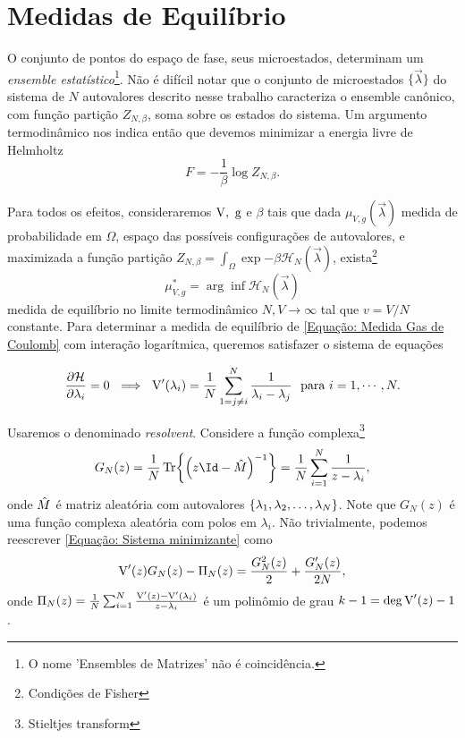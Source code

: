 \section{Medidas de Equilíbrio}

O conjunto de pontos do espaço de fase, seus microestados, determinam um \textit{ensemble estatístico}\footnote{O nome 'Ensembles de Matrizes' não é coincidência.}. Não é difícil notar que o conjunto de microestados $\{\vec{\lambda}\}$ do sistema de $N$ autovalores descrito nesse trabalho caracteriza o ensemble canônico, com função partição $Z_{N, \beta}$, soma sobre os estados do sistema. Um argumento termodinâmico nos indica então que devemos minimizar a energia livre de Helmholtz $$F = -\frac{1}{\beta} \log{Z_{N, \beta}}.$$ 

Para todos os efeitos, consideraremos $\operatorname{V}, \ \operatorname{g}$ e $\beta$ tais que dada $\mu_{V,g}(\vec{\lambda})$ medida de probabilidade em $\Omega$, espaço das possíveis configurações de autovalores, e maximizada a função partição $Z_{N, \beta} = \int_{\Omega} \exp{-\beta \mathcal{H}_N(\vec{\lambda})}$, exista\footnote{Condições de Fisher} $$\mu_{V,g}^* = \arg \inf {\mathcal{H}_N(\vec{\lambda})}$$ medida de equilíbrio no limite termodinâmico $N, V \rightarrow \infty$ tal que $v = V/N$ constante. Para determinar a medida de equilíbrio \cite{RMT-firstcourse-Potters} de \ref{Equação: Medida Gas de Coulomb} com interação logarítmica, queremos satisfazer o sistema de equações

\begin{equation}
	\frac{\partial \mathcal{H}}{\partial \lambda_i} = 0 \ \implies \ \operatorname{V}'(\lambda_i) = \frac{1}{N} \sum_{1 = j \neq i}^{N} \frac{1}{\lambda_i - \lambda_j} \ \ \text{para} \ i = 1, \cdots, N.
	\label{Equação: Sistema minimizante}
\end{equation} 

\noindent Usaremos o denominado \textit{resolvent}. Considere a função complexa\footnote{Stieltjes transform} $$G_N(z) = \frac{1}{N} \Tr{\left(z\Id - \matriz{M}\right)^{-1}} = \frac{1}{N} \sum_{i=1}^{N} \frac{1}{z - \lambda_i},$$ onde $\hat M$ é matriz aleatória com autovalores $\{\lambda_1, \lambda_2, \dots, \lambda_N\}$. Note que $G_N(z)$ é uma função complexa aleatória com polos em $\lambda_i$. Não trivialmente, podemos reescrever \ref{Equação: Sistema minimizante} como $$\operatorname{V}'(z) G_N(z) - \Pi_N(z) = \frac{G_N^2(z)}{2} + \frac{G'_N(z)}{2N},$$ onde $\Pi_N(z) = \frac{1}{N} \sum_{i = 1}^{N} \frac{\operatorname{V}'(z) - \operatorname{V}'(\lambda_i)}{z - \lambda_i}$ é um polinômio de grau $k - 1 = \deg{\operatorname{V}'(z)} - 1$. 

